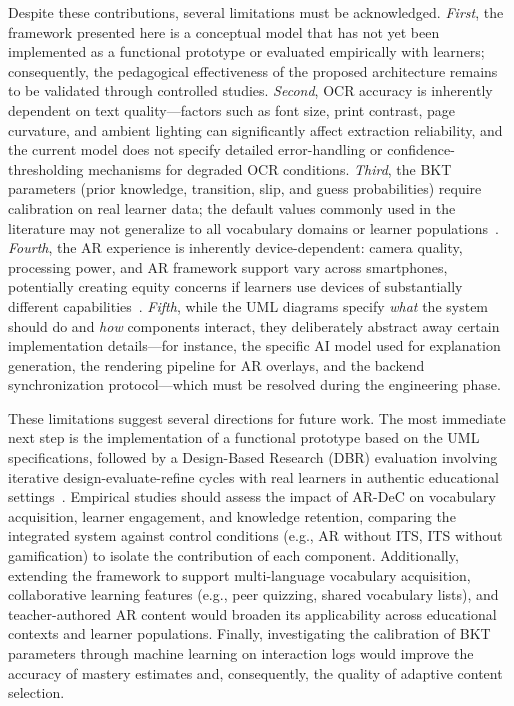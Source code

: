 Despite these contributions, several limitations must be acknowledged. \emph{First}, the framework presented here is a conceptual model that has not yet been implemented as a functional prototype or evaluated empirically with learners; consequently, the pedagogical effectiveness of the proposed architecture remains to be validated through controlled studies. \emph{Second}, OCR accuracy is inherently dependent on text quality---factors such as font size, print contrast, page curvature, and ambient lighting can significantly affect extraction reliability, and the current model does not specify detailed error-handling or confidence-thresholding mechanisms for degraded OCR conditions. \emph{Third}, the BKT parameters (prior knowledge, transition, slip, and guess probabilities) require calibration on real learner data; the default values commonly used in the literature may not generalize to all vocabulary domains or learner populations~\cite{Corbett1994}. \emph{Fourth}, the AR experience is inherently device-dependent: camera quality, processing power, and AR framework support vary across smartphones, potentially creating equity concerns if learners use devices of substantially different capabilities~\cite{Garzon2019}. \emph{Fifth}, while the UML diagrams specify \emph{what} the system should do and \emph{how} components interact, they deliberately abstract away certain implementation details---for instance, the specific AI model used for explanation generation, the rendering pipeline for AR overlays, and the backend synchronization protocol---which must be resolved during the engineering phase.

These limitations suggest several directions for future work. The most immediate next step is the implementation of a functional prototype based on the UML specifications, followed by a Design-Based Research (DBR) evaluation involving iterative design-evaluate-refine cycles with real learners in authentic educational settings~\cite{Crompton2017}. Empirical studies should assess the impact of AR-DeC on vocabulary acquisition, learner engagement, and knowledge retention, comparing the integrated system against control conditions (e.g., AR without ITS, ITS without gamification) to isolate the contribution of each component. Additionally, extending the framework to support multi-language vocabulary acquisition, collaborative learning features (e.g., peer quizzing, shared vocabulary lists), and teacher-authored AR content would broaden its applicability across educational contexts and learner populations. Finally, investigating the calibration of BKT parameters through machine learning on interaction logs would improve the accuracy of mastery estimates and, consequently, the quality of adaptive content selection.
